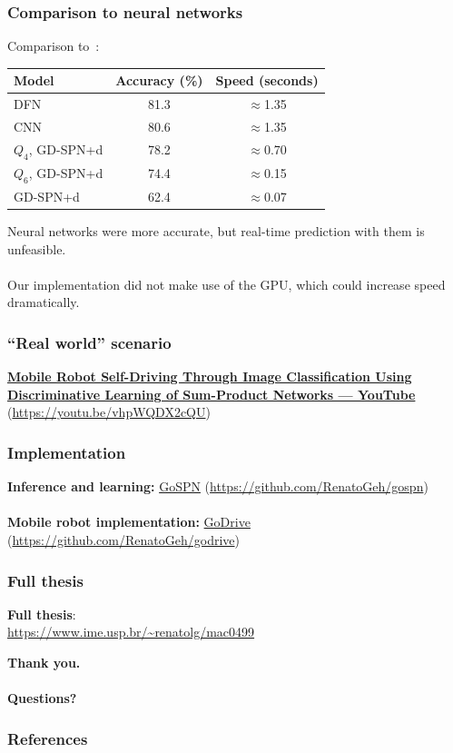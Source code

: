 \documentclass{beamer}
\begin{document}
\begin{frame}
  \frametitle{Comparison to neural networks}

  Comparison to~\cite{self-driving}:

  \begin{table}
    \centering
    \begin{tabular}{l|c|c}
      \textbf{Model} & \textbf{Accuracy (\%)} & \textbf{Speed (seconds)}\\
      \hline
      DFN & 81.3 & $\approx$1.35\\
      CNN & 80.6 & $\approx$1.35\\
      $Q_4$, GD-SPN+d & 78.2 & $\approx$0.70\\
      $Q_6$, GD-SPN+d & 74.4 & $\approx$0.15\\
      GD-SPN+d & 62.4 & $\approx$0.07
    \end{tabular}
  \end{table}

  Neural networks were more accurate, but real-time prediction with them is unfeasible.\\~\\

  Our implementation did not make use of the GPU, which could increase speed dramatically.

\end{frame}

\begin{frame}
  \frametitle{``Real world'' scenario}

  \footnotesize\centering\textbf{\href{https://youtu.be/vhpWQDX2cQU}{Mobile Robot Self-Driving Through Image Classification Using
  Discriminative Learning of Sum-Product Networks --- YouTube}}
  (\url{https://youtu.be/vhpWQDX2cQU})
\end{frame}

\begin{frame}
  \frametitle{Implementation}
  \centering
  \large\textbf{Inference and learning:} \href{https://github.com/RenatoGeh/gospn}{GoSPN}
  (\url{https://github.com/RenatoGeh/gospn})\\~\\

  \textbf{Mobile robot implementation:} \href{https://github.com/RenatoGeh/godrive}{GoDrive}
  (\url{https://github.com/RenatoGeh/godrive})

\end{frame}

\begin{frame}
  \frametitle{Full thesis}

  \centering\large
  \textbf{Full thesis}:\\\url{https://www.ime.usp.br/~renatolg/mac0499}

\end{frame}

\begin{frame}[standout]
  \textbf{Thank you.\\~\\Questions?}
\end{frame}

\begin{frame}[t,allowframebreaks]
  \frametitle{References}
  \printbibliography[heading=none]
\end{frame}
\end{document}
